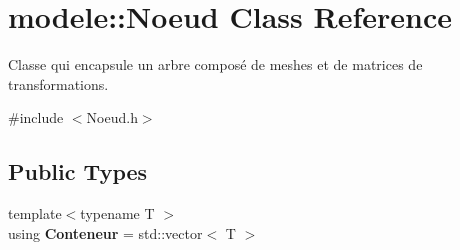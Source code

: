 \hypertarget{classmodele_1_1_noeud}{}\section{modele\+:\+:Noeud Class Reference}
\label{classmodele_1_1_noeud}


Classe qui encapsule un arbre composé de meshes et de matrices de transformations.  




{\ttfamily \#include $<$Noeud.\+h$>$}

\subsection*{Public Types}
\begin{DoxyCompactItemize}
\item 
\hypertarget{classmodele_1_1_noeud_aebc16c98cd928d1cc3167c8bbffc1d40}{}{\footnotesize template$<$typename T $>$ }\\using {\bfseries Conteneur} = std\+::vector$<$ T $>$\label{classmodele_1_1_noeud_aebc16c98cd928d1cc3167c8bbffc1d40}

\end{DoxyCompactItemize}
